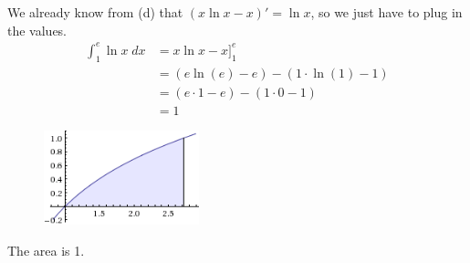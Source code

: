 \documentclass[a4paper]{article}
\begin{document}
\begin{enumerate}
\begin{enumerate}
We already know from (d) that $(x \ln x - x)' = \ln x$, so we just have to plug in the values.\\


\begin{align*}
	\int_1^e \ln x \; dx &= x \ln x -x \Bigg]_1^e\\
	&= (e \ln(e) - e)-(1 \cdot \ln(1) - 1)\\
	&= (e \cdot 1 - e) - (1 \cdot 0 - 1)\\
	&= 1
\end{align*}	
	
\begin{figure}[ht]
	\centering
  \includegraphics[width=0.4\textwidth]{e.png}
\end{figure}	
	
The area is 1.	
	
	
\end{enumerate}




	
\end{enumerate}
\end{document}
